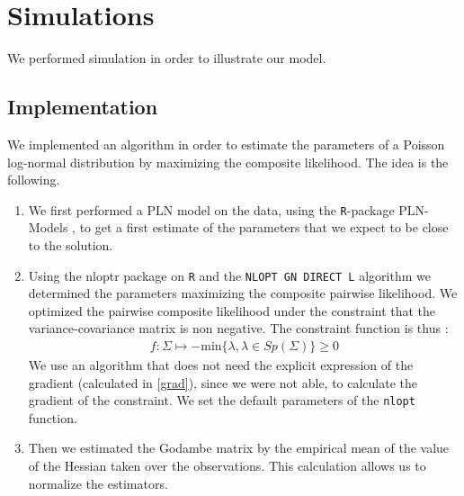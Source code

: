 \documentclass[11pt, a4paper]{article}
\begin{document}
\section{Simulations}
We performed simulation in order to illustrate our model.
\subsection{Implementation}
We implemented an algorithm in order to estimate the parameters of a Poisson log-normal distribution by maximizing the composite likelihood. The idea is the following.
\begin{enumerate}
\item We first performed a PLN model on the data, using the \texttt{R}-package PLN-Models \cite{chiquet2017variational}, to get a first estimate of the parameters that we expect to be close to the solution. 
\item Using the nloptr package on \texttt{R} and the \texttt{NLOPT GN DIRECT L} algorithm we determined the parameters maximizing the composite pairwise likelihood. We optimized the pairwise composite likelihood under the constraint that the variance-covariance matrix is non negative.  The constraint function is thus :
\begin{align*}
f : \Sigma \mapsto - \mathrm{min}\{\lambda, \lambda \in Sp(\Sigma)\} \geq 0
\end{align*}
We use an algorithm that does not need the explicit expression of the gradient (calculated in \ref{grad}), since we were not able, to calculate the gradient of the constraint. We set the default parameters of the \texttt{nlopt} function.
\item Then we estimated the Godambe matrix by the empirical mean of the value of the Hessian taken over the observations. This calculation allows us to normalize the estimators.
\end{enumerate}
\end{document}
